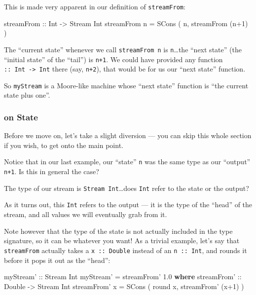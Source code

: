 \documentclass[]{article}
\newenvironment{Shaded}{}{}
\newcommand{\KeywordTok}[1]{\textcolor[rgb]{0.00,0.44,0.13}{\textbf{{#1}}}}
\newcommand{\DataTypeTok}[1]{\textcolor[rgb]{0.56,0.13,0.00}{{#1}}}
\newcommand{\DecValTok}[1]{\textcolor[rgb]{0.25,0.63,0.44}{{#1}}}
\newcommand{\FloatTok}[1]{\textcolor[rgb]{0.25,0.63,0.44}{{#1}}}
\newcommand{\OtherTok}[1]{\textcolor[rgb]{0.00,0.44,0.13}{{#1}}}
\newcommand{\FunctionTok}[1]{\textcolor[rgb]{0.02,0.16,0.49}{{#1}}}
\newcommand{\NormalTok}[1]{{#1}}
\begin{document}
This is made very apparent in our definition of \texttt{streamFrom}:

\begin{Shaded}
\begin{Highlighting}[]
\OtherTok{streamFrom ::} \DataTypeTok{Int} \OtherTok{->} \DataTypeTok{Stream} \DataTypeTok{Int}
\NormalTok{streamFrom n }\FunctionTok{=} \DataTypeTok{SCons} \NormalTok{( n, streamFrom (n}\FunctionTok{+}\DecValTok{1}\NormalTok{) )}
\end{Highlighting}
\end{Shaded}

The ``current state'' whenever we call \texttt{streamFrom\ n} is \texttt{n}\ldots{}the ``next
state'' (the ``initial state'' of the ``tail'') is \texttt{n+1}. We could have provided any function
\texttt{::\ Int\ -\textgreater{}\ Int} there (say, \texttt{n+2}), that would be for us our ``next
state'' function.

So \texttt{myStream} is a Moore-like machine whose ``next state'' function is ``the current state
plus one''.

\subsubsection{on State}\label{on-state}

Before we move on, let's take a slight diversion --- you can skip this whole section if you wish, to
get onto the main point.

Notice that in our last example, our ``state'' \texttt{n} was the same type as our ``output''
\texttt{n+1}. Is this in general the case?

The type of our stream is \texttt{Stream\ Int}\ldots{}does \texttt{Int} refer to the state or the
output?

As it turns out, this \texttt{Int} refers to the output --- it is the type of the ``head'' of the
stream, and all values we will eventually grab from it.

Note however that the type of the state is not actually included in the type signature, so it can be
whatever you want! As a trivial example, let's say that \texttt{streamFrom} actually takes a
\texttt{x\ ::\ Double} instead of an \texttt{n\ ::\ Int}, and rounds it before it pops it out as the
``head'':

\begin{Shaded}
\begin{Highlighting}[]
\OtherTok{myStream' ::} \DataTypeTok{Stream} \DataTypeTok{Int}
\NormalTok{myStream' }\FunctionTok{=} \NormalTok{streamFrom' }\FloatTok{1.0}
  \KeywordTok{where}
\OtherTok{    streamFrom' ::} \DataTypeTok{Double} \OtherTok{->} \DataTypeTok{Stream} \DataTypeTok{Int}
    \NormalTok{streamFrom' x }\FunctionTok{=} \DataTypeTok{SCons} \NormalTok{( round x, streamFrom' (x}\FunctionTok{+}\DecValTok{1}\NormalTok{) )}
\end{Highlighting}
\end{Shaded}
\end{document}
